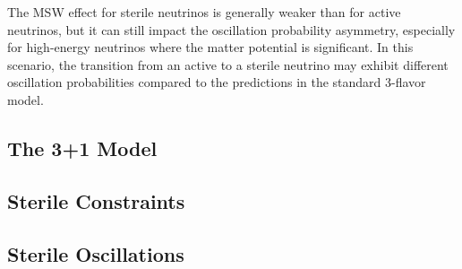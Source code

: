 \documentclass[a4paper,12pt,numbered]{article}
\begin{document}
The MSW effect for sterile neutrinos is generally weaker than for active neutrinos, but it can still impact the oscillation probability asymmetry, especially for high-energy neutrinos where the matter potential is significant. In this scenario, the transition from an active to a sterile neutrino may exhibit different oscillation probabilities compared to the predictions in the standard 3-flavor model.

\subsection{The 3+1 Model}
\subsection{Sterile Constraints}
\subsection{Sterile Oscillations}




\end{document}
